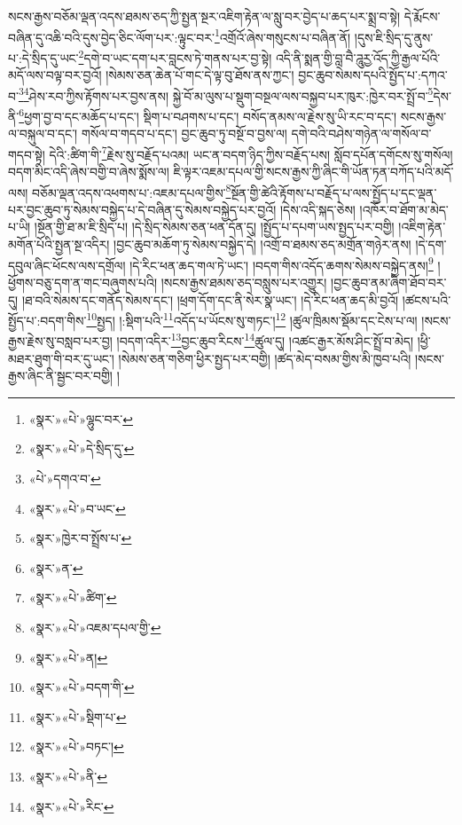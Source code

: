 སངས་རྒྱས་བཅོམ་ལྡན་འདས་ཐམས་ཅད་ཀྱི་སྤྱན་སྔར་འཇིག་རྟེན་ལ་སླུ་བར་བྱེད་པ་ཆད་པར་སྨྲ་བ་སྟེ། དེ་རྨོངས་བཞིན་དུ་འཆི་བའི་དུས་བྱེད་ཅིང་ལོག་པར་:ལྟུང་བར་\footnote{«སྣར་»«པེ་»ལྷུང་བར་}འགྲོའོ་ཞེས་གསུངས་པ་བཞིན་ནོ། །དུས་ཇི་སྲིད་དུ་ནུས་པ་:དེ་སྲིད་དུ་ཡང་\footnote{«སྣར་»«པེ་»དེ་སྲིད་དུ་}དགེ་བ་ཡང་དག་པར་བླངས་ཏེ་གནས་པར་བྱ་སྟེ། འདི་ནི་སྨན་གྱི་བླ་བཻ་ཌཱུརྱ་འོད་ཀྱི་རྒྱལ་པོའི་མདོ་ལས་བལྟ་བར་བྱའོ། །སེམས་ཅན་ཆེན་པོ་གང་དེ་ལྟ་བུ་ཐོས་ནས་ཀྱང་། བྱང་ཆུབ་སེམས་དཔའི་སྤྱོད་པ་:དཀའ་བ་\footnote{«པེ་»དགའ་བ་}\footnote{«སྣར་»«པེ་»བ་ཡང་}ཤེས་རབ་ཀྱིས་རྟོགས་པར་བྱས་ནས། སྐྱེ་བོ་མ་ལུས་པ་སྡུག་བསྔལ་ལས་བསྐྱབ་པར་ཁུར་:ཁྱེར་བར་སྤྲོ་བ་\footnote{«སྣར་»ཁྱེར་བ་སྤྲོས་པ་}དེས་ནི་\footnote{«སྣར་»ན་}ཕྱག་བྱ་བ་དང་མཆོད་པ་དང་། སྡིག་པ་བཤགས་པ་དང་། བསོད་ནམས་ལ་རྗེས་སུ་ཡི་རང་བ་དང་། སངས་རྒྱས་ལ་བསྐུལ་བ་དང་། གསོལ་བ་གདབ་པ་དང་། བྱང་ཆུབ་ཏུ་བསྔོ་བ་བྱས་ལ། དགེ་བའི་བཤེས་གཉེན་ལ་གསོལ་བ་གདབ་སྟེ། དེའི་:ཚིག་གི་\footnote{«སྣར་»«པེ་»ཚིག་}རྗེས་སུ་བརྗོད་པའམ། ཡང་ན་བདག་ཉིད་ཀྱིས་བརྗོད་པས། སློབ་དཔོན་དགོངས་སུ་གསོལ། བདག་མིང་འདི་ཞེས་བགྱི་བ་ཞེས་སྨོས་ལ། ཇི་ལྟར་འཇམ་དཔལ་གྱི་སངས་རྒྱས་ཀྱི་ཞིང་གི་ཡོན་ཏན་བཀོད་པའི་མདོ་ལས། བཅོམ་ལྡན་འདས་འཕགས་པ་:འཇམ་དཔལ་གྱིས་\footnote{«སྣར་»«པེ་»འཇམ་དཔལ་གྱི་}སྔོན་གྱི་ཚེའི་རྟོགས་པ་བརྗོད་པ་ལས་སྤྱོད་པ་དང་ལྡན་པར་བྱང་ཆུབ་ཏུ་སེམས་བསྐྱེད་པ་དེ་བཞིན་དུ་སེམས་བསྐྱེད་པར་བྱའོ། །དེས་འདི་སྐད་ཅེས། །འཁོར་བ་ཐོག་མ་མེད་པ་ཡི། །སྔོན་གྱི་ཐ་མ་ཇི་སྲིད་པ། །དེ་སྲིད་སེམས་ཅན་ཕན་དོན་དུ། །སྤྱོད་པ་དཔག་ཡས་སྤྱད་པར་བགྱི། །འཇིག་རྟེན་མགོན་པོའི་སྤྱན་སྔ་འདིར། །བྱང་ཆུབ་མཆོག་ཏུ་སེམས་བསྐྱེད་དེ། །འགྲོ་བ་ཐམས་ཅད་མགྲོན་གཉེར་ནས། །དེ་དག་དབུལ་ཞིང་ཕོངས་ལས་དགྲོལ། །དེ་རིང་ཕན་ཆད་གལ་ཏེ་ཡང་། །བདག་གིས་འདོད་ཆགས་སེམས་བསྐྱེད་ནས།\footnote{«སྣར་»«པེ་»ན།} །ཕྱོགས་བཅུ་དག་ན་གང་བཞུགས་པའི། །སངས་རྒྱས་ཐམས་ཅད་བསླུས་པར་འགྱུར། །བྱང་ཆུབ་ནམ་ཞིག་ཐོབ་བར་དུ། །ཐ་བའི་སེམས་དང་གནོད་སེམས་དང་། །ཕྲག་དོག་དང་ནི་སེར་སྣ་ཡང་། །དེ་རིང་ཕན་ཆད་མི་བྱའོ། །ཚངས་པའི་སྤྱོད་པ་:བདག་གིས་\footnote{«སྣར་»«པེ་»བདག་གི་}སྤྱད། །:སྡིག་པའི་\footnote{«སྣར་»«པེ་»སྡིག་པ་}འདོད་པ་ཡོངས་སུ་གཏང་།\footnote{«སྣར་»«པེ་»བཏང་།} །ཚུལ་ཁྲིམས་སྡོམ་དང་ངེས་པ་ལ། །སངས་རྒྱས་རྗེས་སུ་བསླབ་པར་བྱ། །བདག་འདིར་\footnote{«སྣར་»«པེ་»ནི་}བྱང་ཆུབ་རིངས་\footnote{«སྣར་»«པེ་»རིང་}ཚུལ་དུ། །འཚང་རྒྱར་མོས་ཤིང་སྤྲོ་བ་མེད། །ཕྱི་མཐར་ཐུག་གི་བར་དུ་ཡང་། །སེམས་ཅན་གཅིག་ཕྱིར་སྤྱད་པར་བགྱི། །ཚད་མེད་བསམ་གྱིས་མི་ཁྱབ་པའི། །སངས་རྒྱས་ཞིང་ནི་སྦྱང་བར་བགྱི། །
